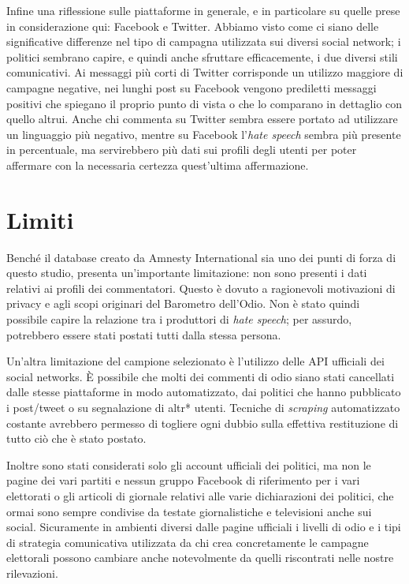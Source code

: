 Infine una riflessione sulle piattaforme in generale, e in particolare su quelle prese in considerazione qui: Facebook e Twitter. Abbiamo visto come ci siano delle significative differenze nel tipo di campagna utilizzata sui diversi social network; i politici sembrano capire, e quindi  anche sfruttare efficacemente, i due diversi stili comunicativi. Ai messaggi più corti di Twitter corrisponde un utilizzo maggiore di campagne negative, nei lunghi post su Facebook vengono prediletti messaggi positivi che spiegano il proprio punto di vista o che lo comparano in dettaglio con quello altrui.
Anche chi commenta su Twitter sembra essere portato ad utilizzare un linguaggio più negativo, mentre su Facebook l'\textit{hate speech} sembra più presente in percentuale, ma servirebbero più dati sui profili degli utenti per poter affermare con la necessaria certezza quest'ultima affermazione.

\section{Limiti}
Benché il database creato da Amnesty International sia uno dei punti di forza di questo studio, presenta un'importante limitazione: non sono presenti i dati relativi ai profili dei commentatori. Questo è dovuto a ragionevoli motivazioni di privacy e agli scopi originari del Barometro dell'Odio. Non è stato quindi possibile capire la relazione tra i produttori di \textit{hate speech}; per assurdo, potrebbero essere stati postati tutti dalla stessa persona.

Un'altra limitazione del campione selezionato è l'utilizzo delle API ufficiali dei social networks. È possibile che molti dei commenti di odio siano stati cancellati dalle stesse piattaforme in modo automatizzato, dai politici che hanno pubblicato i post/tweet o su segnalazione di altr* utenti. Tecniche di \textit{scraping} automatizzato costante avrebbero permesso di togliere ogni dubbio sulla effettiva restituzione di tutto ciò che è stato postato.

Inoltre sono stati considerati solo gli account ufficiali dei politici, ma non le pagine dei vari partiti e nessun gruppo Facebook di riferimento per i vari elettorati o gli articoli di giornale relativi alle varie dichiarazioni dei politici, che ormai sono sempre condivise da testate giornalistiche e televisioni anche sui social. Sicuramente in ambienti diversi dalle pagine ufficiali i livelli di odio e i tipi di strategia comunicativa utilizzata da chi crea concretamente le campagne elettorali possono cambiare anche notevolmente da quelli riscontrati nelle nostre rilevazioni.

